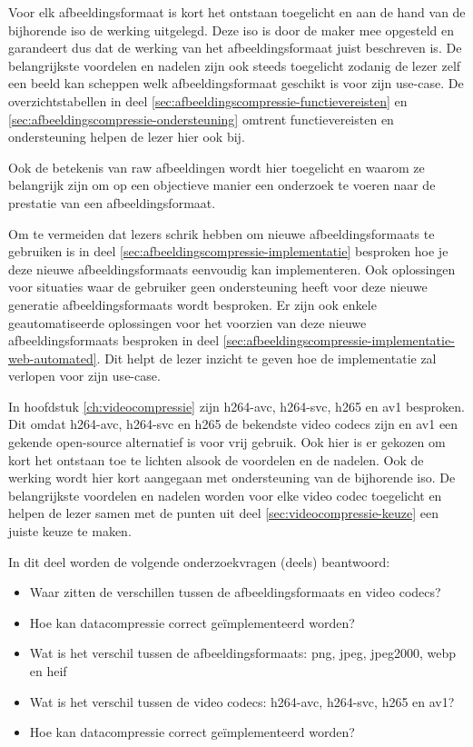 Voor elk \gls{afbeeldingsformaat} is kort het ontstaan toegelicht en aan de hand van de bijhorende \gls{iso} de werking uitgelegd. Deze \gls{iso} is door de maker mee opgesteld en garandeert dus dat de werking van het \gls{afbeeldingsformaat} juist beschreven is. De belangrijkste voordelen en nadelen zijn ook steeds toegelicht zodanig de lezer zelf een beeld kan scheppen welk \gls{afbeeldingsformaat} geschikt is voor zijn \gls{use-case}. De overzichtstabellen in deel \ref{sec:afbeeldingscompressie-functievereisten} en \ref{sec:afbeeldingscompressie-ondersteuning} omtrent functievereisten en ondersteuning helpen de lezer hier ook bij.

Ook de betekenis van \gls{raw} afbeeldingen wordt hier toegelicht en waarom ze belangrijk zijn om op een objectieve manier een onderzoek te voeren naar de prestatie van een \gls{afbeeldingsformaat}.

Om te vermeiden dat lezers schrik hebben om nieuwe \glspl{afbeeldingsformaat} te gebruiken is in deel \ref{sec:afbeeldingscompressie-implementatie} besproken hoe je deze nieuwe \glspl{afbeeldingsformaat} eenvoudig kan implementeren. Ook oplossingen voor situaties waar de gebruiker geen ondersteuning heeft voor deze nieuwe generatie \glspl{afbeeldingsformaat} wordt besproken. Er zijn ook enkele geautomatiseerde oplossingen voor het voorzien van deze nieuwe \glspl{afbeeldingsformaat} besproken in deel \ref{sec:afbeeldingscompressie-implementatie-web-automated}. Dit helpt de lezer inzicht te geven hoe de implementatie zal verlopen voor zijn \gls{use-case}.

In hoofdstuk \ref{ch:videocompressie} zijn \gls{h264-avc}, \gls{h264-svc}, \gls{h265} en \gls{av1} besproken. Dit omdat \gls{h264-avc}, \gls{h264-svc} en \gls{h265} de bekendste video \glspl{codec} zijn en \gls{av1} een gekende \gls{open-source} alternatief is voor vrij gebruik. Ook hier is er gekozen om kort het ontstaan toe te lichten alsook de voordelen en de nadelen. Ook de werking wordt hier kort aangegaan met ondersteuning van de bijhorende \gls{iso}. De belangrijkste voordelen en nadelen worden voor elke video \gls{codec} toegelicht en helpen de lezer samen met de punten uit deel \ref{sec:videocompressie-keuze} een juiste keuze te maken.

In dit deel worden de volgende onderzoekvragen (deels) beantwoord: 
\begin{itemize}
	\item Waar zitten de verschillen tussen de \glspl{afbeeldingsformaat} en video \glspl{codec}?
	\item Hoe kan \gls{datacompressie} correct geïmplementeerd worden?
	\item Wat is het verschil tussen de \glspl{afbeeldingsformaat}: \gls{png}, \gls{jpeg}, \gls{jpeg2000}, \gls{webp} en \gls{heif}
	\item Wat is het verschil tussen de video \glspl{codec}: \gls{h264-avc}, \gls{h264-svc}, \gls{h265} en \gls{av1}?
	\item Hoe kan \gls{datacompressie} correct geïmplementeerd worden?
\end{itemize}

